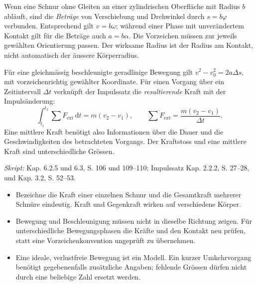 \clearpage
\begin{werkzeugkasten}
Wenn eine Schnur ohne Gleiten an einer zylindrischen Oberfläche mit Radius
$b$ abläuft, sind die \emph{Beträge} von Verschiebung und Drehwinkel durch
$s=b\varphi$ verbunden. Entsprechend gilt $v=b\omega$; während einer Phase
mit unverändertem Kontakt gilt für die Beträge auch $a=b\alpha$. Die
Vorzeichen müssen zur jeweils gewählten Orientierung passen. Der wirksame
Radius ist der Radius am Kontakt, nicht automatisch der äussere Körperradius.

Für eine gleichmässig beschleunigte geradlinige Bewegung gilt
$v^2-v_0^2=2a\Delta s$, mit vorzeichenrichtig gewählter Koordinate. Für einen
Vorgang über ein Zeitintervall $\Delta t$ verknüpft der Impulssatz die
\emph{resultierende} Kraft mit der Impulsänderung:
\begin{equation}
  \int_{t_1}^{t_2}\sum F_{\mathrm{ext}}\,\mathrm dt
    = m(v_2-v_1),
  \qquad
  \overline{\sum F_{\mathrm{ext}}}
    =\frac{m(v_2-v_1)}{\Delta t}.
\end{equation}
Eine mittlere Kraft benötigt also Informationen über die Dauer und die
Geschwindigkeiten des betrachteten Vorgangs. Der Kraftstoss und eine mittlere
Kraft sind unterschiedliche Grössen.

\textit{Skript:} Kap. 6.2.5 und 6.3, S. 106 und 109--110; Impulssatz
Kap. 2.2.2, S. 27--28, und Kap. 3.2, S. 52--53.
\end{werkzeugkasten}

\begin{achtung}
\begin{itemize}
  \item Bezeichne die Kraft einer einzelnen Schnur und die Gesamtkraft mehrerer
        Schnüre eindeutig. Kraft und Gegenkraft wirken auf verschiedene Körper.
  \item Bewegung und Beschleunigung müssen nicht in dieselbe Richtung zeigen.
        Für unterschiedliche Bewegungsphasen die Kräfte und den Kontakt neu
        prüfen, statt eine Vorzeichenkonvention ungeprüft zu übernehmen.
  \item Eine ideale, verlustfreie Bewegung ist ein Modell. Ein kurzer
        Umkehrvorgang benötigt gegebenenfalls zusätzliche Angaben; fehlende
        Grössen dürfen nicht durch eine beliebige Zahl ersetzt werden.
\end{itemize}
\end{achtung}
